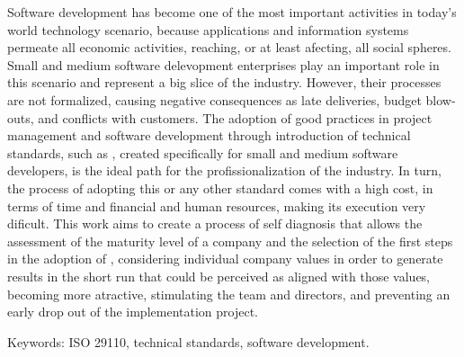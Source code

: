 Software development has become one of the most important activities in today's world technology scenario, because applications and information systems permeate all economic activities, reaching, or at least afecting, all social spheres. Small and medium software delevopment enterprises play an important role in this scenario and represent a big slice of the industry. However, their processes are not formalized, causing negative consequences as late deliveries, budget blow-outs, and conflicts with customers. The adoption of good practices in project management and software development through introduction of technical standards, such as \iso, created specifically for small and medium software developers, is the ideal path for the profissionalization of the industry. In turn, the process of adopting this or any other standard comes with a high cost, in terms of time and financial and human resources, making its execution very dificult. This work aims to create a process of self diagnosis that allows the assessment of the maturity level of a company and the selection of the first steps in the adoption of \iso, considering individual company values in order to generate results in the short run that could be perceived as aligned with those values, becoming more atractive, stimulating the team and directors, and preventing an early drop out of the implementation project.

Keywords: ISO 29110, technical standards, software development.